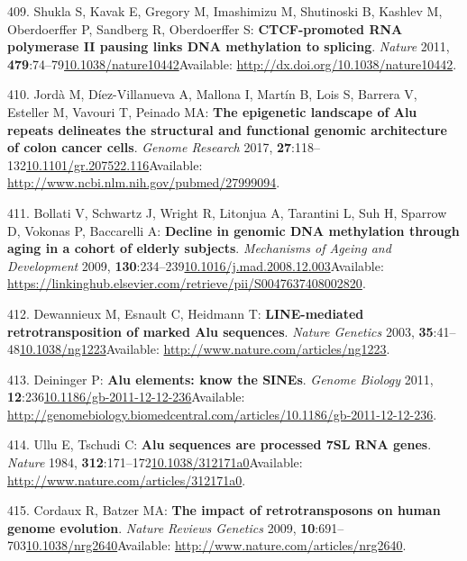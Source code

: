 \documentclass[
]{book}
\begin{document}
\leavevmode\hypertarget{ref-Shukla2011}{}%
409. Shukla S, Kavak E, Gregory M, Imashimizu M, Shutinoski B, Kashlev M, Oberdoerffer P, Sandberg R, Oberdoerffer S: \textbf{CTCF-promoted RNA polymerase II pausing links DNA methylation to splicing}. \emph{Nature} 2011, \textbf{479}:74--79\href{https://doi.org/10.1038/nature10442}{10.1038/nature10442}Available: \url{http://dx.doi.org/10.1038/nature10442}.

\leavevmode\hypertarget{ref-Jorda2017}{}%
410. Jordà M, Díez-Villanueva A, Mallona I, Martín B, Lois S, Barrera V, Esteller M, Vavouri T, Peinado MA: \textbf{The epigenetic landscape of Alu repeats delineates the structural and functional genomic architecture of colon cancer cells}. \emph{Genome Research} 2017, \textbf{27}:118--132\href{https://doi.org/10.1101/gr.207522.116}{10.1101/gr.207522.116}Available: \url{http://www.ncbi.nlm.nih.gov/pubmed/27999094}.

\leavevmode\hypertarget{ref-Bollati2010}{}%
411. Bollati V, Schwartz J, Wright R, Litonjua A, Tarantini L, Suh H, Sparrow D, Vokonas P, Baccarelli A: \textbf{Decline in genomic DNA methylation through aging in a cohort of elderly subjects}. \emph{Mechanisms of Ageing and Development} 2009, \textbf{130}:234--239\href{https://doi.org/10.1016/j.mad.2008.12.003}{10.1016/j.mad.2008.12.003}Available: \url{https://linkinghub.elsevier.com/retrieve/pii/S0047637408002820}.

\leavevmode\hypertarget{ref-Dewannieux2003}{}%
412. Dewannieux M, Esnault C, Heidmann T: \textbf{LINE-mediated retrotransposition of marked Alu sequences}. \emph{Nature Genetics} 2003, \textbf{35}:41--48\href{https://doi.org/10.1038/ng1223}{10.1038/ng1223}Available: \url{http://www.nature.com/articles/ng1223}.

\leavevmode\hypertarget{ref-Deininger2011}{}%
413. Deininger P: \textbf{Alu elements: know the SINEs}. \emph{Genome Biology} 2011, \textbf{12}:236\href{https://doi.org/10.1186/gb-2011-12-12-236}{10.1186/gb-2011-12-12-236}Available: \url{http://genomebiology.biomedcentral.com/articles/10.1186/gb-2011-12-12-236}.

\leavevmode\hypertarget{ref-Ullu1984}{}%
414. Ullu E, Tschudi C: \textbf{Alu sequences are processed 7SL RNA genes}. \emph{Nature} 1984, \textbf{312}:171--172\href{https://doi.org/10.1038/312171a0}{10.1038/312171a0}Available: \url{http://www.nature.com/articles/312171a0}.

\leavevmode\hypertarget{ref-Cordaux2009}{}%
415. Cordaux R, Batzer MA: \textbf{The impact of retrotransposons on human genome evolution}. \emph{Nature Reviews Genetics} 2009, \textbf{10}:691--703\href{https://doi.org/10.1038/nrg2640}{10.1038/nrg2640}Available: \url{http://www.nature.com/articles/nrg2640}.
\end{document}
